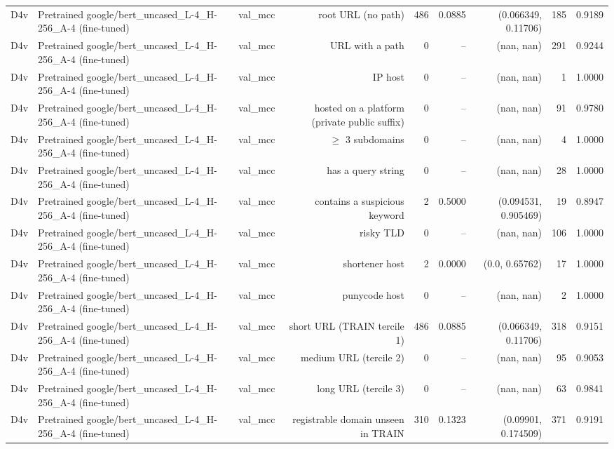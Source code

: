\begin{table}[t]
\begin{tabular}{llrrrrrrr}
D4v & Pretrained google/bert\_uncased\_L-4\_H-256\_A-4 (fine-tuned) & val\_mcc & root URL (no path) & 486 & 0.0885 & (0.066349, 0.11706) & 185 & 0.9189 \\
D4v & Pretrained google/bert\_uncased\_L-4\_H-256\_A-4 (fine-tuned) & val\_mcc & URL with a path & 0 & -- & (nan, nan) & 291 & 0.9244 \\
D4v & Pretrained google/bert\_uncased\_L-4\_H-256\_A-4 (fine-tuned) & val\_mcc & IP host & 0 & -- & (nan, nan) & 1 & 1.0000 \\
D4v & Pretrained google/bert\_uncased\_L-4\_H-256\_A-4 (fine-tuned) & val\_mcc & hosted on a platform (private public suffix) & 0 & -- & (nan, nan) & 91 & 0.9780 \\
D4v & Pretrained google/bert\_uncased\_L-4\_H-256\_A-4 (fine-tuned) & val\_mcc & $\geq$ 3 subdomains & 0 & -- & (nan, nan) & 4 & 1.0000 \\
D4v & Pretrained google/bert\_uncased\_L-4\_H-256\_A-4 (fine-tuned) & val\_mcc & has a query string & 0 & -- & (nan, nan) & 28 & 1.0000 \\
D4v & Pretrained google/bert\_uncased\_L-4\_H-256\_A-4 (fine-tuned) & val\_mcc & contains a suspicious keyword & 2 & 0.5000 & (0.094531, 0.905469) & 19 & 0.8947 \\
D4v & Pretrained google/bert\_uncased\_L-4\_H-256\_A-4 (fine-tuned) & val\_mcc & risky TLD & 0 & -- & (nan, nan) & 106 & 1.0000 \\
D4v & Pretrained google/bert\_uncased\_L-4\_H-256\_A-4 (fine-tuned) & val\_mcc & shortener host & 2 & 0.0000 & (0.0, 0.65762) & 17 & 1.0000 \\
D4v & Pretrained google/bert\_uncased\_L-4\_H-256\_A-4 (fine-tuned) & val\_mcc & punycode host & 0 & -- & (nan, nan) & 2 & 1.0000 \\
D4v & Pretrained google/bert\_uncased\_L-4\_H-256\_A-4 (fine-tuned) & val\_mcc & short URL (TRAIN tercile 1) & 486 & 0.0885 & (0.066349, 0.11706) & 318 & 0.9151 \\
D4v & Pretrained google/bert\_uncased\_L-4\_H-256\_A-4 (fine-tuned) & val\_mcc & medium URL (tercile 2) & 0 & -- & (nan, nan) & 95 & 0.9053 \\
D4v & Pretrained google/bert\_uncased\_L-4\_H-256\_A-4 (fine-tuned) & val\_mcc & long URL (tercile 3) & 0 & -- & (nan, nan) & 63 & 0.9841 \\
D4v & Pretrained google/bert\_uncased\_L-4\_H-256\_A-4 (fine-tuned) & val\_mcc & registrable domain unseen in TRAIN & 310 & 0.1323 & (0.09901, 0.174509) & 371 & 0.9191 \\

\end{tabular}
\end{table}

